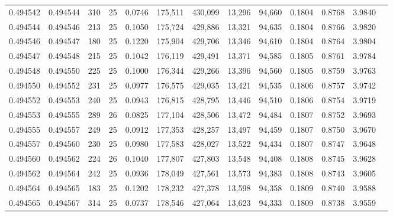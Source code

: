 \begin{tabular}{rrrrrrrrrrrrr}
0.494542 & 0.494544 & 310 &  25 &                                     0.0746 & 175,511 & 430,099 &  13,296 &  94,660 & 0.1804 & 0.8768 & 3.9840 \\
0.494544 & 0.494546 & 213 &  25 &                                     0.1050 & 175,724 & 429,886 &  13,321 &  94,635 & 0.1804 & 0.8766 & 3.9820 \\
0.494546 & 0.494547 & 180 &  25 &                                     0.1220 & 175,904 & 429,706 &  13,346 &  94,610 & 0.1804 & 0.8764 & 3.9804 \\
0.494547 & 0.494548 & 215 &  25 &                                     0.1042 & 176,119 & 429,491 &  13,371 &  94,585 & 0.1805 & 0.8761 & 3.9784 \\
0.494548 & 0.494550 & 225 &  25 &                                     0.1000 & 176,344 & 429,266 &  13,396 &  94,560 & 0.1805 & 0.8759 & 3.9763 \\
0.494550 & 0.494552 & 231 &  25 &                                     0.0977 & 176,575 & 429,035 &  13,421 &  94,535 & 0.1806 & 0.8757 & 3.9742 \\
0.494552 & 0.494553 & 240 &  25 &                                     0.0943 & 176,815 & 428,795 &  13,446 &  94,510 & 0.1806 & 0.8754 & 3.9719 \\
0.494553 & 0.494555 & 289 &  26 &                                     0.0825 & 177,104 & 428,506 &  13,472 &  94,484 & 0.1807 & 0.8752 & 3.9693 \\
0.494555 & 0.494557 & 249 &  25 &                                     0.0912 & 177,353 & 428,257 &  13,497 &  94,459 & 0.1807 & 0.8750 & 3.9670 \\
0.494557 & 0.494560 & 230 &  25 &                                     0.0980 & 177,583 & 428,027 &  13,522 &  94,434 & 0.1807 & 0.8747 & 3.9648 \\
0.494560 & 0.494562 & 224 &  26 &                                     0.1040 & 177,807 & 427,803 &  13,548 &  94,408 & 0.1808 & 0.8745 & 3.9628 \\
0.494562 & 0.494564 & 242 &  25 &                                     0.0936 & 178,049 & 427,561 &  13,573 &  94,383 & 0.1808 & 0.8743 & 3.9605 \\
0.494564 & 0.494565 & 183 &  25 &                                     0.1202 & 178,232 & 427,378 &  13,598 &  94,358 & 0.1809 & 0.8740 & 3.9588 \\
0.494565 & 0.494567 & 314 &  25 &                                     0.0737 & 178,546 & 427,064 &  13,623 &  94,333 & 0.1809 & 0.8738 & 3.9559 \\

\end{tabular}
